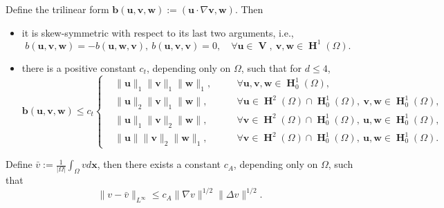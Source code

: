 \begin{lemma} \label{lem:trilinear} 
	Define the trilinear form 
	$\bm b(\bm u,  \bm v,  \bm w):=(\bm u \cdot \nabla  \bm v,  \bm w)$.  Then 
	\begin{itemize} 
		\item[(i)]  it is skew-symmetric with respect to its last two arguments, i.e.,
		\begin{equation*}
			b(\bm u,  \bm v,  \bm w)=-b(\bm u,  \bm w,  \bm v), ~b(\bm u,  \bm v,  \bm v)=0, \quad  \forall \bm u \in \mbfV, ~  \bm v,  \bm w \in \mbfH^1(\Omega).
		\end{equation*}
		\item[(ii)]
		there is a positive constant  $c_t$, depending only on $\Omega$, such that for $d \le 4$,
		\begin{equation*}
			\bm b( \bm u,  \bm v,  \bm w)   \leq c_t
			\left\{
			\begin{aligned}
				&\|\bm u\|_1 \| \bm v\|_1 \| \bm w\|_1, && \quad \forall  \bm u, \bm v, \bm w \in \mbfH_0^1(\Omega), \\
				&\| \bm u\|_2\| \bm v\|_1\| \bm w\|, && \quad  \forall  \bm u \in \mbfH^2(\Omega) \cap \mbfH_0^1(\Omega), ~  \bm v, \bm w \in \mbfH_0^1(\Omega), \\
				&\| \bm u\|_1\| \bm v\|_2\| \bm w\|, && \quad \forall  \bm v \in \mbfH^2(\Omega) \cap \mbfH_0^1(\Omega), ~ \bm u, \bm w \in \mbfH_0^1(\Omega), \\
				&\| \bm u\|\| \bm v\|_2\| \bm w\|_1, && \quad \forall  \bm v \in \mbfH^2(\Omega) \cap \mbfH_0^1(\Omega), ~  \bm u, \bm w \in \mbfH_0^1(\Omega).
			\end{aligned}
			\right.
		\end{equation*}
 	\end{itemize}
\end{lemma}
\begin{lemma}  \label{lem:Agmon}
	Define $\bar{v}:=\frac{1}{|\Omega|} \int_{\Omega} v d \bm x$, then there exists a constant $c_{A}$, depending only on $\Omega$, such that
	\begin{equation*}
		\|v-\bar{v}\|_{L^{\infty}} \leq c_{A}\|\nabla v\|^{1/2} \|\Delta v\|^{1/2}. 
	\end{equation*}
\end{lemma}

